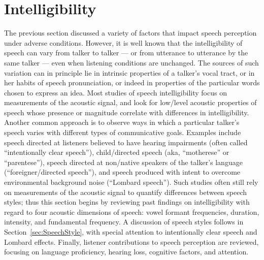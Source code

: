 \section{Intelligibility}
The previous section discussed a variety of factors that impact speech perception under adverse conditions.  However, it is well known that the intelligibility of speech can vary from talker to talker — or from utterance to utterance by the same talker — even when listening conditions are unchanged.  The sources of such variation can in principle lie in intrinsic properties of a talker’s vocal tract, or in her habits of speech pronunciation, or indeed in properties of the particular words chosen to express an idea.  Most studies of speech intelligibility focus on measurements of the acoustic signal, and look for low\-/level acoustic properties of speech whose presence or magnitude correlate with differences in intelligibility.  Another common approach is to observe ways in which a particular talker’s speech varies with different types of communicative goals.  Examples include speech directed at listeners believed to have hearing impairments (often called “intentionally clear speech”), child\-/directed speech (\ac{aka}, “motherese” or “parentese”), speech directed at non\-/native speakers of the talker’s language (“foreigner\-/directed speech”), and speech produced with intent to overcome environmental background noise (“Lombard speech”).  Such studies often still rely on measurements of the acoustic signal to quantify differences between speech styles; thus this section begins by reviewing past findings on intelligibility with regard to four acoustic dimensions of speech: vowel formant frequencies, duration, intensity, and fundamental frequency.  %
A discussion of speech styles follows in Section~\ref{sec:SpeechStyle}, with special attention to intentionally clear speech and Lombard effects.  Finally, listener contributions to speech perception are reviewed, focusing on language proficiency, hearing loss, cognitive factors, and attention.  

